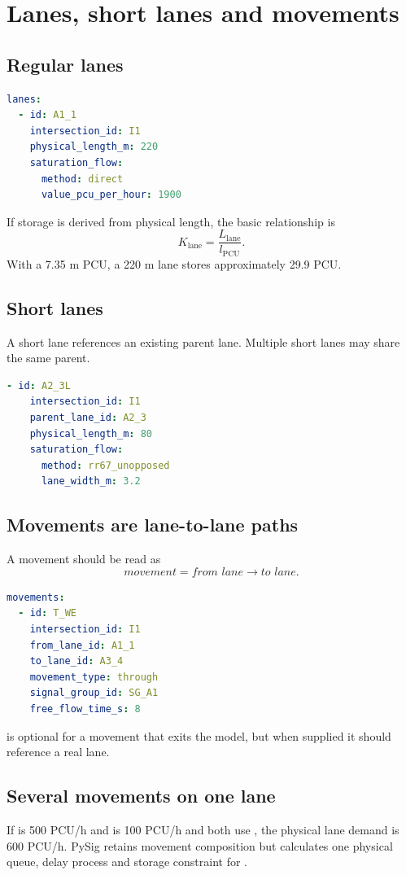 \chapter{Lanes, short lanes and movements}
\section{Regular lanes}
\begin{lstlisting}[language=yaml]
lanes:
  - id: A1_1
    intersection_id: I1
    physical_length_m: 220
    saturation_flow:
      method: direct
      value_pcu_per_hour: 1900
\end{lstlisting}
If storage is derived from physical length, the basic relationship is
\begin{equation}
K_{\mathrm{lane}}=\frac{L_{\mathrm{lane}}}{l_{\mathrm{PCU}}}.
\end{equation}
With a 7.35 m PCU, a 220 m lane stores approximately 29.9 PCU.

\section{Short lanes}
A short lane references an existing parent lane. Multiple short lanes may share the same parent.
\begin{lstlisting}[language=yaml]
  - id: A2_3L
    intersection_id: I1
    parent_lane_id: A2_3
    physical_length_m: 80
    saturation_flow:
      method: rr67_unopposed
      lane_width_m: 3.2
\end{lstlisting}

\section{Movements are lane-to-lane paths}
A movement should be read as
\begin{equation}
\textit{movement}=\textit{from lane}\rightarrow\textit{to lane}.
\end{equation}
\begin{lstlisting}[language=yaml]
movements:
  - id: T_WE
    intersection_id: I1
    from_lane_id: A1_1
    to_lane_id: A3_4
    movement_type: through
    signal_group_id: SG_A1
    free_flow_time_s: 8
\end{lstlisting}
 is optional for a movement that exits the model, but when supplied it should reference a real lane.

\section{Several movements on one lane}
If  is 500 PCU/h and  is 100 PCU/h and both use , the physical lane demand is 600 PCU/h. PySig retains movement composition but calculates one physical queue, delay process and storage constraint for .
